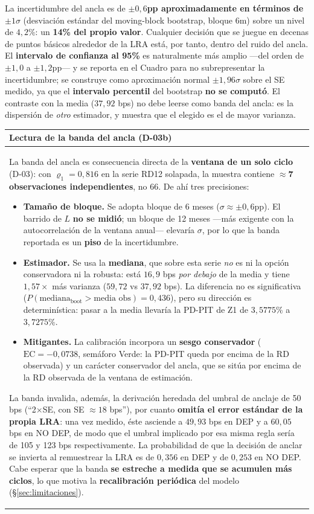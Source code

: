 \documentclass[12pt, a4paper]{article}
\newcommand{\RD}{\ensuremath{\mathrm{RD}}}
\renewcommand{\rho}{\ensuremath{\varrho}}
\newcommand{\EC}{\ensuremath{\mathrm{EC}}}
\newenvironment{recuadro}[1]
{\begin{center}\begin{tabular}{|p{0.92\textwidth}|}
\hline
\rowcolor{grissuave}
\textbf{#1} \\ \hline
}
{\\ \hline \end{tabular}\end{center}}
\begin{document}
\noindent La incertidumbre del ancla es de \textbf{$\pm0{,}6$pp aproximadamente en términos de
$\pm1\sigma$} (desviación estándar del moving-block bootstrap, bloque 6m) sobre un nivel de
$4{,}2\%$: un \textbf{14\% del propio valor}. Cualquier decisión que se juegue en decenas de puntos
básicos alrededor de la LRA está, por tanto, dentro del ruido del ancla. El \textbf{intervalo de
confianza al 95\%} es naturalmente más amplio ---del orden de $\pm1{,}0$ a $\pm1{,}2$pp--- y se
reporta en el Cuadro para no subrepresentar la incertidumbre; se construye como aproximación normal
$\pm1{,}96\sigma$ sobre el SE medido, ya que el \textbf{intervalo percentil} del bootstrap
\textbf{no se computó}. El contraste con la media ($37{,}92$ bps) no debe leerse como banda del
ancla: es la dispersión de \emph{otro} estimador, y muestra que el elegido es el de mayor varianza.

\begin{recuadro}{Lectura de la banda del ancla (D-03b)}
La banda del ancla es consecuencia directa de la \textbf{ventana de un solo ciclo} (D-03): con
$\rho_1=0{,}816$ en la serie RD12 solapada, la muestra contiene \textbf{$\approx$7 observaciones
independientes}, no 66. De ahí tres precisiones:
\begin{itemize}[nosep]
  \item \textbf{Tamaño de bloque.} Se adopta bloque de 6 meses ($\sigma\approx\pm0{,}6$pp). El
    barrido de $L$ \textbf{no se midió}; un bloque de 12 meses ---más exigente con la
    autocorrelación de la ventana anual--- elevaría $\sigma$, por lo que la banda reportada es un
    \textbf{piso} de la incertidumbre.
  \item \textbf{Estimador.} Se usa la \textbf{mediana}, que sobre esta serie \emph{no} es ni la
    opción conservadora ni la robusta: está $16{,}9$ bps \emph{por debajo} de la media y tiene
    $1{,}57\times$ más varianza ($59{,}72$ vs $37{,}92$ bps). La diferencia no es significativa
    ($P(\text{mediana}_{\text{boot}}>\text{media obs})=0{,}436$), pero su dirección es
    determinística: pasar a la media llevaría la PD-PIT de Z1 de $3{,}5775\%$ a $3{,}7275\%$.
  \item \textbf{Mitigantes.} La calibración incorpora un \textbf{sesgo conservador}
    ($\EC=-0{,}0738$, semáforo Verde: la PD-PIT queda por encima de la RD observada) y un
    carácter conservador del ancla, que se sitúa por encima de la \RD{} observada de la ventana
    de estimación.
\end{itemize}
La banda invalida, además, la derivación heredada del umbral de anclaje de 50 bps (``2$\times$SE,
con SE $\approx18$ bps''), por cuanto \textbf{omitía el error estándar de la propia LRA}: una vez
medido, éste asciende a $49{,}93$ bps en DEP y a $60{,}05$ bps en NO DEP, de modo que el umbral
implicado por esa misma regla sería de 105 y 123 bps respectivamente. La probabilidad de que la
decisión de anclar se invierta al remuestrear la LRA es de $0{,}356$ en DEP y de $0{,}253$ en NO
DEP. Cabe esperar que la banda \textbf{se estreche a medida que se acumulen más ciclos}, lo que
motiva la \textbf{recalibración periódica} del modelo (\S\ref{sec:limitaciones}).
\end{recuadro}
\end{document}
